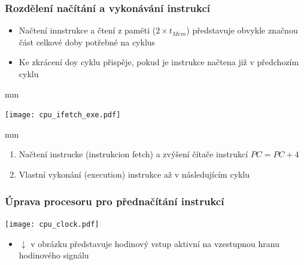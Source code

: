\documentclass{beamer}
\begin{document}
\begin{frame}
\frametitle{Rozdělení načítání a vykonávání instrukcí}

\begin{itemize}
 \item Načtení innstrukce a čtení z paměti ($2 \times t_{Mem}$) představuje obvykle značnou část celkové doby potřebné na cyklus
 \item Ke zkrácení doy cyklu přispěje, pokud je instrukce načtena již v předchozím cyklu
\end{itemize}

 mm

{
\centering
\texttt{[image: cpu\_ifetch\_exe.pdf]}
}

 mm

\begin{enumerate}
 \item Načtení instrucke (instrukcion fetch) a zvýšení čítače instrukcí $PC = PC + 4$
 \item Vlastní vykonání (execution) instrukce až v následujícím cyklu
\end{enumerate}

\end{frame}

\begin{frame}
\frametitle{Úprava procesoru pro přednačítání instrukcí}
\texttt{[image: cpu\_clock.pdf]}
\begin{itemize}
 \item $\downarrow$ v obrázku představuje hodinový vstup aktivní na vzestupnou hranu hodinového signálu
\end{itemize}

\end{frame}
\end{document}
